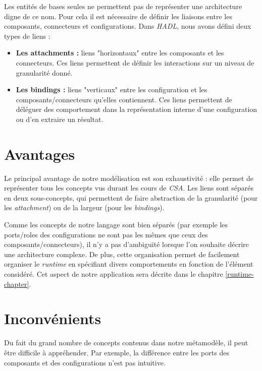         Les entités de bases seules ne permettent pas de représenter une architecture digne de ce nom. Pour cela il est nécessaire de définir les liaisons entre les composants, connecteurs et configurations. Dans \emph{HADL}, nous avons défini deux types de liens :
        \begin{itemize}
        	\item \textbf{Les attachments :} liens "horizontaux" entre les composants et les connecteurs. Ces liens permettent de définir les interactions sur un niveau de granularité donné.
            \item \textbf{Les bindings :} liens "verticaux" entre les configuration et les composants/connecteurs qu'elles contiennent. Ces liens permettent de déléguer des comportement dans la représentation interne d'une configuration ou d'en extraire un résultat.
        \end{itemize}
        
	\section{Avantages}
    
    	Le principal avantage de notre modélisation est son exhaustivité : elle permet de représenter tous les concepts vus durant les cours de \emph{CSA}. Les liens sont séparés en deux sous-concepts, qui permettent de faire abstraction de la granularité (pour les \emph{attachment}) ou de la largeur (pour les \emph{bindings}).
        \newline
        
        Comme les concepts de notre langage sont bien séparés (par exemple les ports/roles des configurations ne sont pas les mêmes que ceux des composants/connecteurs), il n'y a pas d'ambiguïté lorsque l'on souhaite décrire une architecture complexe. De plus, cette organisation permet de facilement organiser le \emph{runtime} en spécifiant divers comportements en fonction de l'élément considéré. Cet aspect de notre application sera décrite dans le chapitre \ref{runtime-chapter}. 
        
	\section{Inconvénients}
    	Du fait du grand nombre de concepts contenus dans notre métamodèle, il peut être difficile à appréhender. Par exemple, la différence entre les ports des composants et des configurations n'est pas intuitive.
        \newline
        
